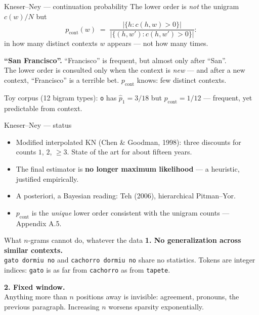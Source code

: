 \documentclass[11pt,aspectratio=169]{beamer}
\newcommand{\dest}[1]{\textcolor{structure}{\textbf{#1}}}
\begin{document}
\begin{frame}{Kneser--Ney --- continuation probability}
  The lower order is \emph{not} the unigram $c(w)/N$ but
  \[
    p_{\text{cont}}(w) \;=\;
    \frac{\big|\{h : c(h,w)>0\}\big|}{\big|\{(h,w') : c(h,w')>0\}\big|} :
  \]
  in how many distinct contexts $w$ appears --- not how many times.

  \vspace{0.8em}
  \textbf{``San Francisco''.} ``Francisco'' is frequent, but almost only after ``San''.\\
  The lower order is consulted only when the context is \emph{new} --- and after a new
  context, ``Francisco'' is a terrible bet. $p_{\text{cont}}$ knows: few distinct contexts.

  \vspace{0.6em}
  Toy corpus (12 bigram types): \texttt{o} has $\hat p_1 = 3/18$ but
  $p_{\text{cont}} = 1/12$ --- frequent, yet predictable from context.
\end{frame}

\begin{frame}{Kneser--Ney --- status}
  \begin{itemize}
    \item Modified interpolated KN (Chen \& Goodman, 1998): three discounts for counts
          $1$, $2$, $\ge 3$. State of the art for about fifteen years.
    \item The final estimator is \dest{no longer maximum likelihood} --- a heuristic,
          justified empirically.
    \item A posteriori, a Bayesian reading: Teh (2006), hierarchical Pitman--Yor.
    \item $p_{\text{cont}}$ is the \emph{unique} lower order consistent with the unigram
          counts --- Appendix A.5.
  \end{itemize}
\end{frame}

\begin{frame}{What $n$-grams cannot do, whatever the data}
  \dest{1. No generalization across similar contexts.}\\
  \texttt{gato dormiu no} and \texttt{cachorro dormiu no} share no statistics.
  Tokens are integer indices: \texttt{gato} is as far from \texttt{cachorro} as from
  \texttt{tapete}.

  \vspace{1em}
  \dest{2. Fixed window.}\\
  Anything more than $n$ positions away is invisible: agreement, pronouns, the previous
  paragraph. Increasing $n$ worsens sparsity exponentially.
\end{frame}
\end{document}
